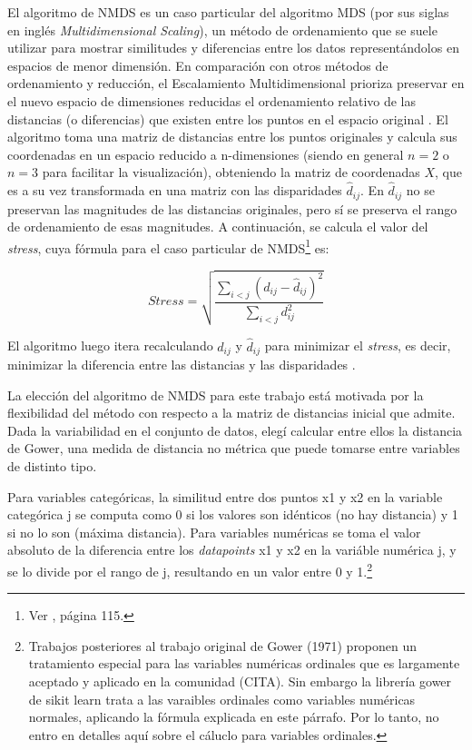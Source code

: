 \documentclass[10 pt]{article}
\begin{document}
El algoritmo de NMDS es un caso particular del algoritmo MDS (por sus siglas en inglés \textit{Multidimensional Scaling}), un método de ordenamiento que se suele utilizar para mostrar similitudes y diferencias entre los datos representándolos en espacios de menor dimensión. En comparación con otros métodos de ordenamiento y reducción, el Escalamiento Multidimensional prioriza preservar en el nuevo espacio de dimensiones reducidas el ordenamiento relativo de las distancias (o diferencias) que existen entre los puntos en el espacio original \citetext{\citealp[p. 218]{aid}}.
El algoritmo toma una matriz de distancias entre los puntos originales y calcula sus coordenadas en un espacio reducido a n-dimensiones (siendo en general \(n=2\) o \(n=3\) para facilitar la visualización), obteniendo la matriz de coordenadas \(X\), %
que es a su vez transformada en una matriz con las disparidades \(\hat{d}_{ij}\). En \(\hat{d}_{ij}\) no se preservan las magnitudes de las distancias originales, pero sí se preserva el rango de ordenamiento de esas magnitudes\citetext{\citealp[p. 219,220]{aid}}. A continuación, se calcula el valor del \textit{stress}, cuya fórmula para el caso particular de NMDS\footnote{ Ver \cite{kruskal1964nonmetric}, página 115.} es: 

\[\textit{Stress} = \sqrt{\frac{\sum_{i<j} \left( d_{ij} - \hat{d}_{ij} \right)^2}{\sum_{i<j} d_{ij}^2}}\]

El algoritmo luego itera recalculando \(d_{ij}\) y \(\hat{d}_{ij}\) para minimizar el \textit{stress}, es decir, minimizar la diferencia entre las distancias y las disparidades \citetext{\citealp[p. 117-123]{kruskal1964nonmetric}}. 


La elección del algoritmo de NMDS para este trabajo está motivada por la flexibilidad del método con respecto a la matriz de distancias inicial que admite. Dada la variabilidad en el conjunto de datos, elegí calcular entre ellos la distancia de Gower, una medida de distancia no métrica que puede tomarse entre variables de distinto tipo. 

Para variables categóricas, la similitud entre dos puntos x1 y x2 en la variable categórica j se computa como 0 si los valores son idénticos (no hay distancia) y 1 si no lo son (máxima distancia). 
Para variables numéricas se toma el valor absoluto de la diferencia entre los \textit{datapoints} x1 y x2 en la variáble numérica j, y se lo divide por el rango de j, resultando en un valor entre 0 y 1.\footnote{Trabajos posteriores al trabajo original de Gower (1971) proponen un tratamiento especial para las variables numéricas ordinales que es largamente aceptado y aplicado en la comunidad (CITA). Sin embargo la librería gower de sikit learn trata a las varaibles ordinales como variables numéricas normales, aplicando la fórmula explicada en este párrafo. Por lo tanto, no entro en detalles aquí sobre el cáluclo para variables ordinales.} 
\end{document}
